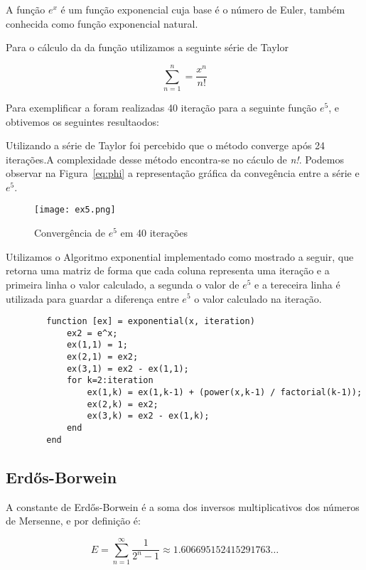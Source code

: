 		A função $e^x$ é um função exponencial cuja base é o número de Euler,
		também conhecida como função exponencial natural.

		Para o cálculo da da função utilizamos a seguinte série de Taylor

		\begin{equation}
			\sum_{n=1}^{n} = \frac{x^n}{n!}
		\end{equation}

		Para exemplificar a foram realizadas 40 iteração para a seguinte função
		$e^5$, e obtivemos os seguintes resultaodos:

		

		Utilizando a série de Taylor foi percebido que o método converge após 24
		iterações.A complexidade desse método encontra-se no cáculo de
		\emph{n!}.  Podemos observar na Figura~\ref{eq:phi} a representação
		gráfica da convegência entre a série e $e^5$. 

		\begin{figure}[H] \centering
			\texttt{[image: ex5.png]} 
		\caption{Convergência de $e^5$ em 40 iterações}
		\label{ex5} 
		\end{figure}

		Utilizamos o Algoritmo exponential implementado como mostrado a seguir,
		que retorna uma matriz de forma que cada coluna representa uma iteração
		e a primeira linha o valor calculado, a segunda o valor de $e^5$ e a
		tereceira linha é utilizada para guardar a diferença entre $e^5$ o valor
		calculado na iteração.

		\begin{lstlisting}
		function [ex] = exponential(x, iteration)
			ex2 = e^x;
			ex(1,1) = 1;
			ex(2,1) = ex2;
			ex(3,1) = ex2 - ex(1,1);
			for k=2:iteration
				ex(1,k) = ex(1,k-1) + (power(x,k-1) / factorial(k-1));
				ex(2,k) = ex2;
				ex(3,k) = ex2 - ex(1,k);
			end
		end
		\end{lstlisting}

	\subsection{Erdős-Borwein}

		A constante de Erdős-Borwein é a soma dos inversos multiplicativos dos
		números de Mersenne, e por definição é:

		\begin{equation}
			E = \displaystyle\sum_{n=1}^{\infty} \frac{1}{2^n-1} \approx 1.606695152415291763\dots
		\end{equation}

